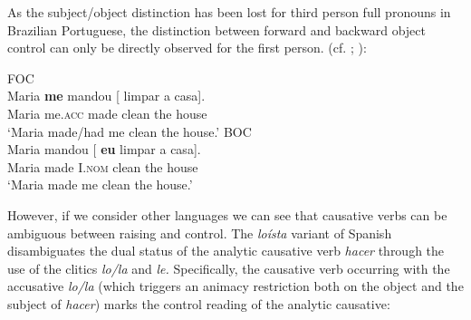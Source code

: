 \documentclass[output=paper]{langsci/langscibook}
\begin{document}
As the subject\slash object distinction has been lost for third person full pronouns in Brazilian Portuguese, the distinction between forward and backward object control can only be directly observed for the first person. (cf. \citealt{Farrell1995}; \citealt{Boeckx2004,Boeckx2006}):

\ea%
    \label{ex:moreno:5}
    \z
\z    



\ea%
    \label{ex:moreno:6}
    \ea  FOC\\
    \gll Maria  \textbf{me}        mandou  [ limpar a    casa].      \\
         Maria  me.\textsc{acc} made     {}  clean   the house\\
    \glt ‘Maria made/had me clean the house.’
    \ex  BOC \\
    \gll Maria mandou [ \textbf{eu}        limpar a   casa].      \\
         Maria made     {}  I.\textsc{nom}  clean  the house\\
    \glt ‘Maria made me clean the house.’
    \z
\z    

However, if we consider other languages we can see that causative verbs can be ambiguous between raising and control. The \textit{loísta} variant of Spanish disambiguates the dual status of the analytic causative verb \textit{hacer} through the use of the clitics \textit{lo\slash la} and \textit{le.} Specifically, the causative verb occurring with the accusative \textit{lo\slash la} (which triggers an animacy restriction both on the object and the subject of \textit{hacer}) marks the control reading of the analytic causative:

\ea%
    \label{ex:moreno:7}
    \z
\z
\end{document}
